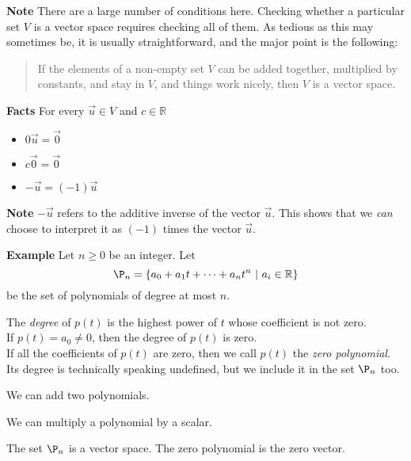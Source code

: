  \begin{frame}[fragile]
\textbf{Note}
There are a large number of conditions here.   Checking whether a particular set $V$
is a vector space requires checking all of them.  As tedious as this may sometimes
be, it is usually straightforward, and the major point is the following: 
\begin{quote}
If the elements of a non-empty set $V$ can be added together, multiplied by constants, 
and stay in $V$, and things work nicely, then $V$ is a vector space. 
\end{quote}

\end{frame}





 \begin{frame}[fragile]

\textbf{Facts}
For every $\vec{u} \in V$ and $c \in \mathbb R$
\begin{itemize}
\item $0 \vec{u} = \vec{0}$
\item $c \vec{0} = \vec{0}$
\item $-\vec{u} = (-1)\vec{u}$
\end{itemize}



\textbf{Note}
$-\vec{u}$ refers to the additive inverse of the vector $\vec{u}$.  This 
shows that we {\em can} choose to interpret it as $(-1)$ times the vector $\vec{u}$. 

\end{frame}






 \begin{frame}[fragile]

\textbf{Example}
Let $n \geq 0$ be an integer.  Let 
$$\P_n = \{ a_0 + a_1 t + \dots +a_n t^n \ |\  a_i\in \mathbb R \} $$ 
be the set of polynomials of degree at most  $n$.


The {\em degree } of $p(t)$ is the highest power of $t$ whose coefficient is not zero.  \\ 
If $p(t)=a_0\neq 0$,  then the degree of $p(t)$ is zero.  \\ 
If all the coefficients of $p(t)$ 
are zero, then we call $p(t)$ the {\em zero polynomial}.  Its degree is technically speaking 
undefined, but we include it in the set $\P_n$ too.


We can add two polynomials.


We can multiply a polynomial by a scalar.



The set $\P_n$ is a vector space.  The zero polynomial is the zero vector.


\end{frame}





